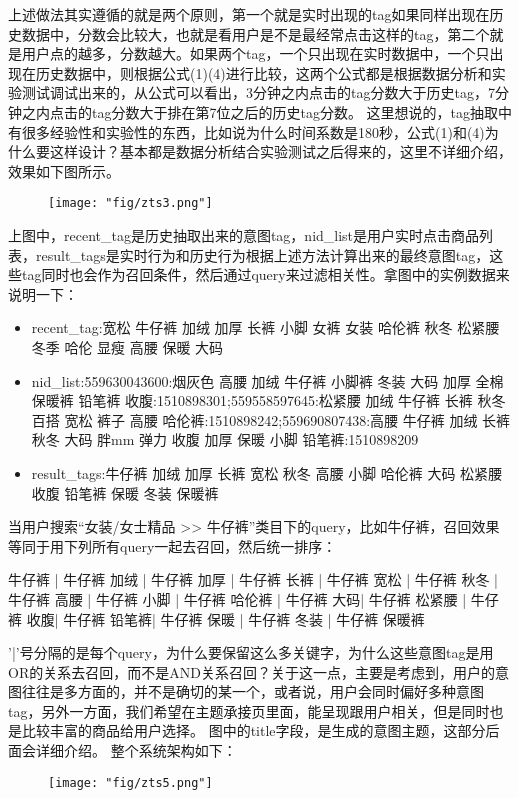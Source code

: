 上述做法其实遵循的就是两个原则，第一个就是实时出现的tag如果同样出现在历史数据中，分数会比较大，也就是看用户是不是最经常点击这样的tag，第二个就是用户点的越多，分数越大。如果两个tag，一个只出现在实时数据中，一个只出现在历史数据中，则根据公式(1)(4)进行比较，这两个公式都是根据数据分析和实验测试调试出来的，从公式可以看出，3分钟之内点击的tag分数大于历史tag，7分钟之内点击的tag分数大于排在第7位之后的历史tag分数。
这里想说的，tag抽取中有很多经验性和实验性的东西，比如说为什么时间系数是180秒，公式(1)和(4)为什么要这样设计？基本都是数据分析结合实验测试之后得来的，这里不详细介绍，效果如下图所示。
\begin{figure}[!h]
	\centering
	\texttt{[image: "fig/zts3.png"]}
	\caption{}
	\label{fig:zts3}
\end{figure}

上图中，recent\_tag是历史抽取出来的意图tag，nid\_list是用户实时点击商品列表，result\_tags是实时行为和历史行为根据上述方法计算出来的最终意图tag，这些tag同时也会作为召回条件，然后通过query来过滤相关性。拿图中的实例数据来说明一下：
\begin{itemize}
\item recent\_tag:宽松 牛仔裤 加绒 加厚 长裤 小脚 女裤 女装 哈伦裤 秋冬 松紧腰 冬季 哈伦 显瘦 高腰 保暖 大码
\item nid\_list:559630043600:烟灰色 高腰 加绒 牛仔裤 小脚裤 冬装 大码 加厚 全棉 保暖裤 铅笔裤 收腹:1510898301;559558597645:松紧腰 加绒 牛仔裤 长裤 秋冬 百搭 宽松 裤子 高腰 哈伦裤:1510898242;559690807438:高腰 牛仔裤 加绒 长裤 秋冬 大码 胖mm 弹力 收腹 加厚 保暖 小脚 铅笔裤:1510898209
\item result\_tags:牛仔裤 加绒 加厚 长裤 宽松 秋冬 高腰 小脚 哈伦裤 大码 松紧腰 收腹 铅笔裤 保暖 冬装 保暖裤
\end{itemize}

当用户搜索“女装/女士精品 >> 牛仔裤”类目下的query，比如牛仔裤，召回效果等同于用下列所有query一起去召回，然后统一排序：

牛仔裤 | 牛仔裤 加绒 | 牛仔裤 加厚 | 牛仔裤 长裤 | 牛仔裤 宽松 | 牛仔裤 秋冬 | 牛仔裤 高腰 | 牛仔裤 小脚 | 牛仔裤 哈伦裤 | 牛仔裤 大码| 牛仔裤 松紧腰 | 牛仔裤 收腹| 牛仔裤 铅笔裤| 牛仔裤 保暖 | 牛仔裤 冬装 | 牛仔裤 保暖裤


'|'号分隔的是每个query，为什么要保留这么多关键字，为什么这些意图tag是用OR的关系去召回，而不是AND关系召回？关于这一点，主要是考虑到，用户的意图往往是多方面的，并不是确切的某一个，或者说，用户会同时偏好多种意图tag，另外一方面，我们希望在主题承接页里面，能呈现跟用户相关，但是同时也是比较丰富的商品给用户选择。
图中的title字段，是生成的意图主题，这部分后面会详细介绍。
整个系统架构如下：
\begin{figure}[!h]
	\centering
	\texttt{[image: "fig/zts5.png"]}
	\caption{}
	\label{fig:zts5}
\end{figure}


